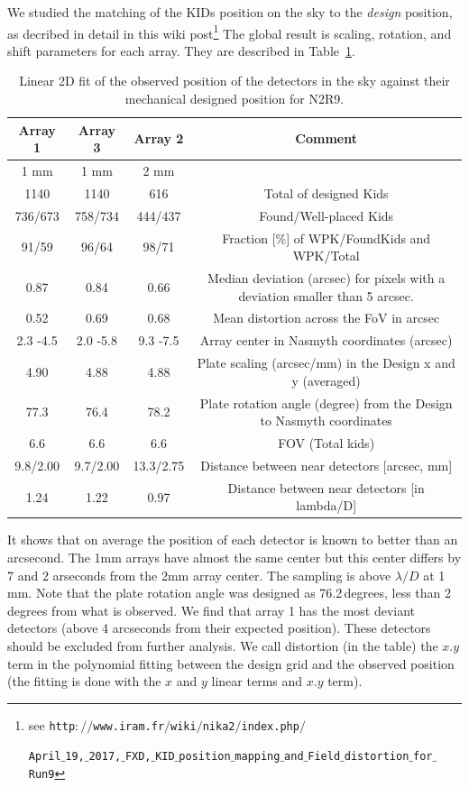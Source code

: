 We studied the matching of the KIDs position on the sky to the
\emph{design} position, as decribed in detail in this wiki post\footnote{see
  {\tt http$://$www.iram.fr$/$wiki$/$nika2$/$index.php$/$}
  
  {\tt April$\_$19,$\_$2017,$\_$FXD,$\_$KID$\_$position$\_$mapping$\_$and$\_$Field$\_$distortion$\_$for$\_$Run9}
}
The global result is scaling, rotation, and shift parameters for each
array. They are described in Table~\ref{ta:gridmatch}.

\begin{table}[ht]
\label{ta:gridmatch}
\begin{center}
\begin{tabular}{|c|c|c|c|}
\hline
Array 1  &	Array 3   &	Array 2   &	Comment \\
\hline
1 mm      &       1 mm     &        2 mm  & \\
1140 	 &      1140 	   &        616  &	Total of designed Kids \\
736/673  &	758/734  &	444/437  &	Found/Well-placed Kids \\
91/59 	 &    96/64 	 &      98/71 	 & Fraction [\%] of WPK/FoundKids and WPK/Total \\
0.87 	 &     0.84 	  & 0.66     &	Median deviation (arcsec) for pixels with a deviation smaller than 5 arcsec. \\
0.52 	 &     0.69 	 &        0.68 	 & Mean distortion across the FoV in arcsec \\
2.3 -4.5  &	2.0 -5.8  &	9.3 -7.5  &	Array center in Nasmyth coordinates (arcsec) \\
4.90  &	4.88  &	4.88  &	Plate scaling (arcsec/mm) in the Design x and y (averaged) \\
77.3  &	76.4  &	78.2  &	Plate rotation angle (degree) from the Design to Nasmyth coordinates \\
6.6  &	6.6  &	6.6  &	FOV (Total kids) \\
9.8/2.00  &	9.7/2.00  &	13.3/2.75  &	Distance between near detectors [arcsec, mm] \\
1.24  &	1.22  &	0.97  &	Distance between near detectors [in lambda/D] \\
\end{tabular}
\end{center}
\caption[Field-of-view deformations]{Linear 2D fit of the observed position of the detectors in the sky
  against their mechanical designed position for N2R9. }
\end{table}

It shows that on average the position of each detector is known to better than
an arcsecond. The 1mm arrays have almost the same center but this center
differs by 7 and 2 arseconds from the 2mm array center. The sampling is above
$\lambda/D$ at 1 mm. Note that the plate rotation angle was designed as
76.2\,degrees, less than 2 degrees from what is observed. We find that array 1
has the most deviant detectors (above 4 arcseconds from their expected
position). These detectors should be excluded from further analysis. We call
distortion (in the table) the $x.y$ term in the polynomial fitting between the
design grid and the observed position (the fitting is done with the $x$ and
$y$ linear terms and $x.y$ term). 



